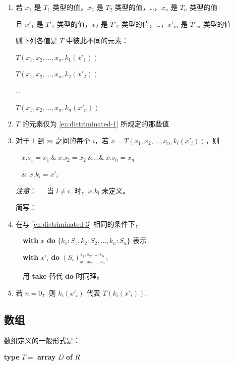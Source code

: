 \documentclass[twoside,11pt,fontset=none]{ctexbook}
\begin{document}
\begin{enumerate}[wide, nosep, label=(\arabic*)]
	\item \label{en:distriminated-1}
	若 $x_1$ 是 $T_1$ 类型的值，$x_2$ 是 $T_2$ 类型的值，\dots，$x_n$ 是 $T_n$ 类型的值
	
	且 $x'_1$ 是 $T'_1$ 类型的值，$x_2$ 是 $T'_2$ 类型的值，\dots，$x'_m$ 是 $T'_m$ 类型的值
	
	则下列各值是 $T$ 中彼此不同的元素：
	
	$T(x_1, x_2, \dots, x_n, k_1(x'_1))$
	
	$T(x_1, x_2, \dots, x_n, k_2(x'_2))$
	
	\quad \dots
	
	$T(x_1, x_2, \dots, x_n, k_n(x'_n))$

	\item $T$ 的元素仅为 \ref{en:distriminated-1} 所规定的那些值
	
	\item\label{en:distriminated-3}
	对于 1 到 $m$ 之间的每个 $i$，若 $x = T(x_1, x_2, \dots, x_n, k_i(x'_i))$，则
	
	\qquad~ $x.s_1 = x_1\ \&\ x.s_2 = x_2\ \& \dots \&\ x.s_n = x_n$
	
	\quad~ \& $x.k_i = x'_i$

	\noindent
	\textit{注意}：\quad~~\, 当 $l \neq i.$ 时，$x.k_l$ 未定义。
	
	\noindent
	简写：
	
	\item 在与 \ref{en:distriminated-3} 相同的条件下，
	
	\quad~\, \textbf{with} $x$ \textbf{do} $\{k_1:S_1, k_2:S_2, \dots, k_n:S_n\}$ 表示

	\quad~\, \textbf{with} $x'_i$ \textbf{do} $(S_i)_{x_1, x_2, \dots, x_n}^{s_1, s_2, \dots, s_n}$;

	\quad~\, 用 \textbf{take} 替代 \textbf{do} 时同理。

	\item 若 $n = 0$，则 $k_i(x'_i)$ 代表 $T(k_i(x'_i)).$
\end{enumerate}

\subsection{数组}

数组定义的一般形式是：

\quad \textbf{type} $T =$ \textbf{array} $D$ \textbf{of} $R$
\end{document}
